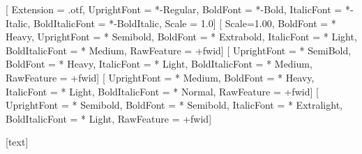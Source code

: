 \setmainfont{LibertinusSerif}[%
  Extension      = .otf,
  UprightFont    = *-Regular,
  BoldFont       = *-Bold,
  ItalicFont     = *-Italic,
  BoldItalicFont = *-BoldItalic,
  Scale          = 1.0]
\setmonofont{Iosevka Term}[%
  Scale=1.00,
  BoldFont        = * Heavy,
  UprightFont     = * Semibold,
  BoldFont        = * Extrabold,
  ItalicFont      = * Light,
  BoldItalicFont  = * Medium,
  RawFeature      = +fwid]
[ %
  UprightFont     = * SemiBold,
  BoldFont        = * Heavy,
  ItalicFont      = * Light,
  BoldItalicFont  = * Medium,
  RawFeature      = +fwid]
[ %
  UprightFont     = * Medium,
  BoldFont        = * Heavy,
  ItalicFont      = * Light,
  BoldItalicFont  = * Normal,
  RawFeature      = +fwid]  
[%
  UprightFont     = * Semibold,
  BoldFont        = * Semibold,
  ItalicFont      = * Extralight,
  BoldItalicFont  = * Light,
  RawFeature      = +fwid]
\newCJKfontfamily{}
\newCJKfontfamily{}
\newCJKfontfamily{}
\newCJKfontfamily{} 

{}%
{}%
[text]

